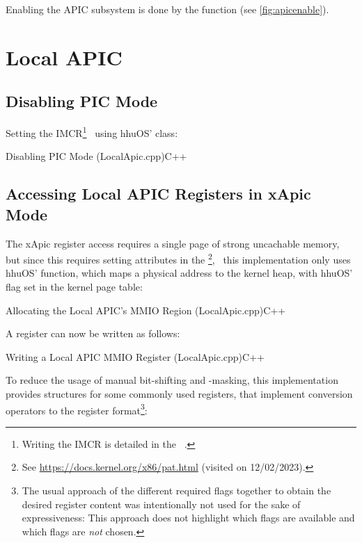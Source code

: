 Enabling the APIC subsystem is done by the  function (see \autoref{fig:apicenable}).

\section{Local APIC}
\label{sec:apxlocalapic}

\subsection{Disabling PIC Mode}
\label{subsec:apxdisablepic}

Setting the IMCR\footnote{
  Writing the IMCR is detailed in the ~\autocite[sec.~3.6.2.1]{mpspec}.}
\ using hhuOS'  class:

\begin{codeblock}{Disabling PIC Mode (LocalApic.cpp)}{C++}
\end{codeblock}

\subsection{Accessing Local APIC Registers in xApic Mode}
\label{subsec:apxxapicregacc}

The xApic register access requires a single page of strong uncachable memory, but since this requires setting attributes in the \footnote{
  See \url{https://docs.kernel.org/x86/pat.html} (visited on 12/02/2023).},
\ this implementation only uses hhuOS'  function, which maps a physical address to the kernel heap, with hhuOS'  flag set in the kernel page table:

\begin{codeblock}{Allocating the Local APIC's MMIO Region (LocalApic.cpp)}{C++}
\end{codeblock}

A register can now be written as follows:

\begin{codeblock}[label=lst:lapicmmiowrite]{Writing a Local APIC MMIO Register (LocalApic.cpp)}{C++}
\end{codeblock}

To reduce the usage of manual bit-shifting and -masking, this implementation provides structures for some commonly used registers, that implement conversion operators to the register format\footnote{
  The usual approach of  the different required flags together to obtain the desired register content was intentionally not used for the sake of expressiveness: This approach does not highlight which flags are available and which flags are \textit{not} chosen.}:

